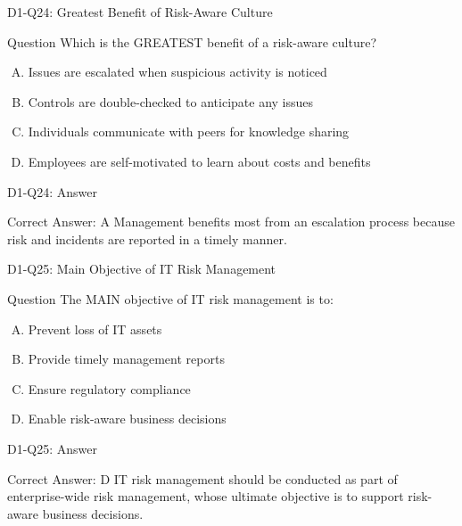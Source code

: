 \documentclass{beamer}
\begin{document}
	\begin{frame}{D1-Q24: Greatest Benefit of Risk-Aware Culture}
		\begin{block}{Question}
			Which is the GREATEST benefit of a risk-aware culture?
		\end{block}
		\begin{enumerate}[(A)]
			\item Issues are escalated when suspicious activity is noticed
			\item Controls are double-checked to anticipate any issues
			\item Individuals communicate with peers for knowledge sharing
			\item Employees are self-motivated to learn about costs and benefits
		\end{enumerate}
	\end{frame}
	\begin{frame}{D1-Q24: Answer}
		\begin{block}{Correct Answer: A}
			Management benefits most from an escalation process because risk and incidents are reported in a timely manner.
		\end{block}
	\end{frame}
	
	\begin{frame}{D1-Q25: Main Objective of IT Risk Management}
		\begin{block}{Question}
			The MAIN objective of IT risk management is to:
		\end{block}
		\begin{enumerate}[(A)]
			\item Prevent loss of IT assets
			\item Provide timely management reports
			\item Ensure regulatory compliance
			\item Enable risk-aware business decisions
		\end{enumerate}
	\end{frame}
	\begin{frame}{D1-Q25: Answer}
		\begin{block}{Correct Answer: D}
			IT risk management should be conducted as part of enterprise-wide risk management, whose ultimate objective is to support risk-aware business decisions.
		\end{block}
	\end{frame}
	
\end{document}
